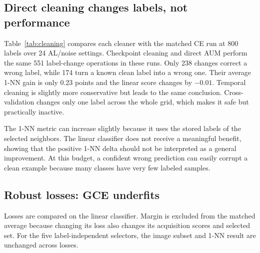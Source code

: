 \documentclass[10pt,twocolumn]{article}
\begin{document}
\begin{table}[t]
  \centering
  \caption{Standard 1-NN test accuracy (\%). Means are over the four noise
  settings; the last columns show why per-noise comparisons matter.}
  \label{tab:standard}
  \resizebox{\columnwidth}{!}{}
\end{table}

\subsection{Direct cleaning changes labels, not performance}

Table~\ref{tab:cleaning} compares each cleaner with the matched CE run at 800
labels over 24 AL/noise settings. Checkpoint cleaning and direct AUM perform the
same 551 label-change operations in these runs. Only 238 changes correct a
wrong label, while 174 turn a known clean label into a wrong one. Their average
1-NN gain is only 0.23 points and the linear score changes by $-0.01$.
Temporal cleaning is slightly more conservative but leads to the same conclusion.
Cross-validation changes only one label across the whole grid, which makes it
safe but practically inactive.

The 1-NN metric can increase slightly because it uses the stored labels of the
selected neighbors. The linear classifier does not receive a meaningful
benefit, showing that the positive 1-NN delta should not be interpreted as a
general improvement. At this budget, a confident wrong prediction can easily
corrupt a clean example because many classes have very few labeled samples.

\begin{table}[t]
  \centering
  \caption{Direct cleaning at 800 labels, averaged over matched settings.
  Change counts are totals over 24 runs and AL episodes, not unique images.}
  \label{tab:cleaning}
  
\end{table}

\subsection{Robust losses: GCE underfits}

Losses are compared on the linear classifier. Margin is excluded from the
matched average because changing its loss also changes its acquisition scores
and selected set. For the five label-independent selectors, the image subset
and 1-NN result are unchanged across losses.
\end{document}
